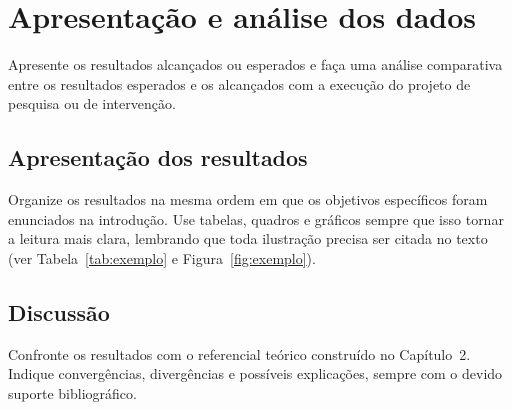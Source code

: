 
\section{Apresentação e análise dos dados}

Apresente os resultados alcançados ou esperados e faça uma análise comparativa
entre os resultados esperados e os alcançados com a execução do projeto de
pesquisa ou de intervenção.

\subsection{Apresentação dos resultados}

Organize os resultados na mesma ordem em que os objetivos específicos foram
enunciados na introdução. Use tabelas, quadros e gráficos sempre que isso tornar
a leitura mais clara, lembrando que toda ilustração precisa ser citada no texto
(ver Tabela~\ref{tab:exemplo} e Figura~\ref{fig:exemplo}).

\subsection{Discussão}

Confronte os resultados com o referencial teórico construído no Capítulo~2.
Indique convergências, divergências e possíveis explicações, sempre com o devido
suporte bibliográfico.
